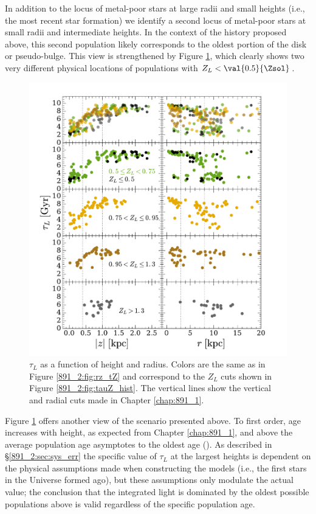 In addition to the locus of metal-poor stars at large radii and small
heights (i.e., the most recent star formation) we identify a second
locus of metal-poor stars at small radii and intermediate heights. In
the context of the history proposed above, this second population
likely corresponds to the oldest portion of the disk or
pseudo-bulge. This view is strengthened by Figure
\ref{891_2:fig:MLWA_rz_cut}, which clearly shows two very different
physical locations of populations with $Z_L < \val{0.5}{\Zsol}$.

\begin{figure}
  \centering
  \includegraphics[width=\textwidth]{891_2/figs/MLWA_rz_cut.pdf}
  \caption[$\tau_L$ as function of
    ($r,|z|$)]{\fixspacing\label{891_2:fig:MLWA_rz_cut}$\tau_L$ as a
    function of height and radius. Colors are the same as in Figure
    \ref{891_2:fig:rz_tZ} and correspond to the $Z_L$ cuts shown in
    Figure \ref{891_2:fig:tauZ_hist}. The vertical lines show the
    vertical and radial cuts made in Chapter \ref{chap:891_1}.}
\end{figure}

Figure \ref{891_2:fig:MLWA_rz_cut} offers another view of the scenario
presented above. To first order, age increases with height, as
expected from Chapter \ref{chap:891_1}, and above  the
average population age asymptotes to the oldest age (). As described in \S\ref{891_2:sec:sys_err} the specific
value of $\tau_L$ at the largest heights is dependent on the physical
assumptions made when constructing the models (i.e., the first stars
in the Universe formed  ago), but these assumptions
only modulate the actual value; the conclusion that the integrated
light is dominated by the oldest possible populations above
 is valid regardless of the specific population age.

